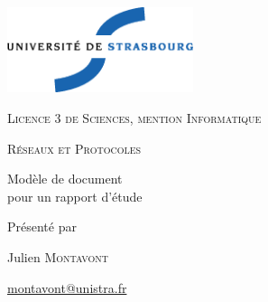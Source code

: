 \thispagestyle{empty}

\begin{center}
       \noindent
       \includegraphics[height=2.5cm]{./pics/uds.eps}       
       
       \vfill\vfill

    {\large \textsc{Licence 3 de Sciences, mention Informatique}}

    \bigskip\bigskip

    {\large \textsc{Réseaux et Protocoles}}

    \vfill\vfill

    {\huge \sc
      \begin{center}
		Modèle de document\\pour un rapport d'étude
      \end{center}}

    \vfill\vfill

    {\large Présenté par}

\medskip

    {\large Julien \textsc{Montavont}}

    {\small \url{montavont@unistra.fr}}

\bigskip

\end{center}
